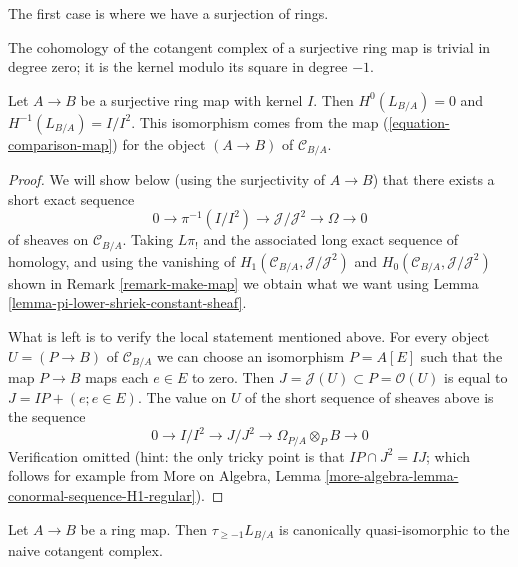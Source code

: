 \noindent
The first case is where we have a surjection of rings.

\begin{lemma}
\label{lemma-surjection}
\begin{slogan}
The cohomology of the cotangent complex of a surjective ring map is trivial in
degree zero; it is the kernel modulo its square in degree $-1$.
\end{slogan}
Let $A \to B$ be a surjective ring map with kernel $I$.
Then $H^0(L_{B/A}) = 0$ and $H^{-1}(L_{B/A}) = I/I^2$.
This isomorphism comes from the map (\ref{equation-comparison-map})
for the object $(A \to B)$ of $\mathcal{C}_{B/A}$.
\end{lemma}

\begin{proof}
We will show below (using the surjectivity of $A \to B$)
that there exists a short exact sequence
$$
0 \to \pi^{-1}(I/I^2) \to \mathcal{J}/\mathcal{J}^2 \to \Omega \to 0
$$
of sheaves on $\mathcal{C}_{B/A}$. Taking $L\pi_!$ and
the associated long exact sequence of homology, and using the
vanishing of $H_1(\mathcal{C}_{B/A}, \mathcal{J}/\mathcal{J}^2)$ and
$H_0(\mathcal{C}_{B/A}, \mathcal{J}/\mathcal{J}^2)$
shown in Remark \ref{remark-make-map} we obtain what we want using
Lemma \ref{lemma-pi-lower-shriek-constant-sheaf}.

\medskip\noindent
What is left is to verify the local statement mentioned above.
For every object $U = (P \to B)$ of $\mathcal{C}_{B/A}$
we can choose an isomorphism $P = A[E]$ such that the map
$P \to B$ maps each $e \in E$ to zero. Then
$J = \mathcal{J}(U) \subset P = \mathcal{O}(U)$
is equal to $J = IP + (e; e \in E)$. The value on $U$ of the short sequence
of sheaves above is the sequence
$$
0 \to I/I^2 \to J/J^2 \to \Omega_{P/A} \otimes_P B \to 0
$$
Verification omitted (hint: the only tricky point is that
$IP \cap J^2 = IJ$; which follows for example from
More on Algebra, Lemma \ref{more-algebra-lemma-conormal-sequence-H1-regular}).
\end{proof}

\begin{lemma}
\label{lemma-relation-with-naive-cotangent-complex}
Let $A \to B$ be a ring map. Then $\tau_{\geq -1}L_{B/A}$
is canonically quasi-isomorphic to the naive cotangent complex.
\end{lemma}

